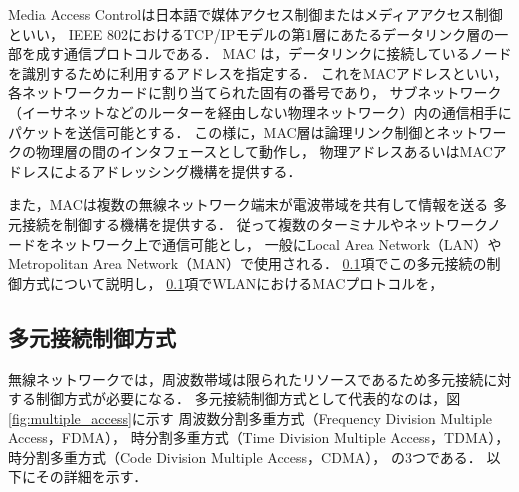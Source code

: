 \documentclass[12pt]{jreport}
\begin{document}
Media Access Controlは日本語で媒体アクセス制御またはメディアアクセス制御といい，
IEEE 802におけるTCP/IPモデルの第1層にあたるデータリンク層の一部を成す通信プロトコルである．
MAC は，データリンクに接続しているノードを識別するために利用するアドレスを指定する．
これをMACアドレスといい，各ネットワークカードに割り当てられた固有の番号であり，
サブネットワーク（イーサネットなどのルーターを経由しない物理ネットワーク）内の通信相手にパケットを送信可能とする．
この様に，MAC層は論理リンク制御とネットワークの物理層の間のインタフェースとして動作し，
物理アドレスあるいはMACアドレスによるアドレッシング機構を提供する．

また，MACは複数の無線ネットワーク端末が電波帯域を共有して情報を送る
多元接続を制御する機構を提供する．
従って複数のターミナルやネットワークノードをネットワーク上で通信可能とし，
一般にLocal Area Network（LAN）やMetropolitan Area Network（MAN）で使用される．
\ref{sec:multiple_access}項でこの多元接続の制御方式について説明し，
\ref{sec:multiple_access}項でWLANにおけるMACプロトコルを，


\subsection{多元接続制御方式}
\label{sec:multiple_access}

無線ネットワークでは，周波数帯域は限られたリソースであるため多元接続に対する制御方式が必要になる．
多元接続制御方式として代表的なのは，図\ref{fig:multiple_access}に示す
周波数分割多重方式（Frequency Division Multiple Access，FDMA），
時分割多重方式（Time Division Multiple Access，TDMA），
時分割多重方式（Code Division Multiple Access，CDMA），
の3つである．
以下にその詳細を示す．
\end{document}
